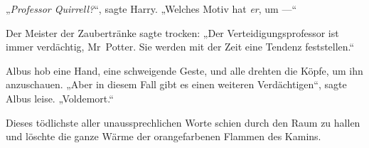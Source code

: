 „\emph{Professor Quirrell?}“, sagte Harry.
„Welches Motiv hat \emph{er}, um —“

Der Meister der Zaubertränke sagte trocken:
„Der Verteidigungsprofessor ist immer verdächtig, Mr~Potter. Sie werden mit der Zeit eine Tendenz feststellen.“

Albus hob eine Hand, eine schweigende Geste, und alle drehten die Köpfe, um ihn anzuschauen.
„Aber in diesem Fall gibt es einen weiteren Verdächtigen“, sagte Albus leise.
„Voldemort.“

Dieses tödlichste aller unaussprechlichen Worte schien durch den Raum zu hallen und löschte die ganze Wärme der orangefarbenen Flammen des Kamins.

